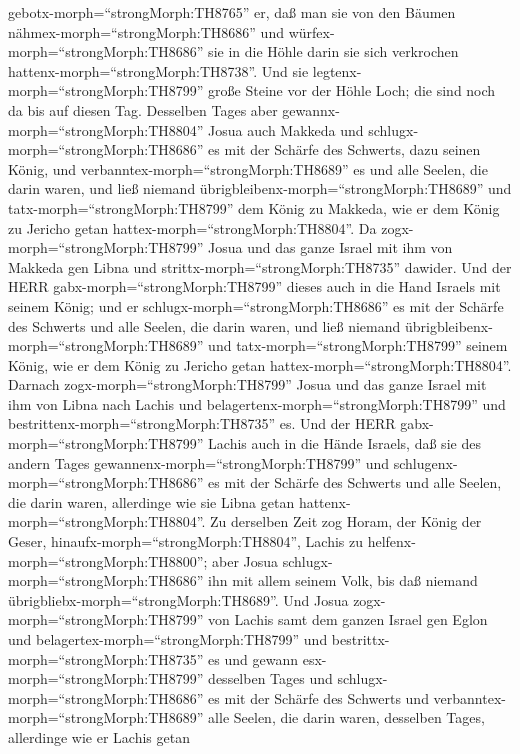 gebotx-morph=``strongMorph:TH8765'' er, daß man sie von den Bäumen
nähmex-morph=``strongMorph:TH8686'' und
würfex-morph=``strongMorph:TH8686'' sie in die Höhle darin sie sich
verkrochen hattenx-morph=``strongMorph:TH8738''. Und sie
legtenx-morph=``strongMorph:TH8799'' große Steine vor der Höhle Loch;
die sind noch da bis auf diesen Tag.  Desselben Tages aber
gewannx-morph=``strongMorph:TH8804'' Josua auch Makkeda und
schlugx-morph=``strongMorph:TH8686'' es mit der Schärfe des Schwerts,
dazu seinen König, und verbanntex-morph=``strongMorph:TH8689'' es und
alle Seelen, die darin waren, und ließ niemand
übrigbleibenx-morph=``strongMorph:TH8689'' und
tatx-morph=``strongMorph:TH8799'' dem König zu Makkeda, wie er dem König
zu Jericho getan hattex-morph=``strongMorph:TH8804''.  Da
zogx-morph=``strongMorph:TH8799'' Josua und das ganze Israel mit ihm von
Makkeda gen Libna und strittx-morph=``strongMorph:TH8735'' dawider.
 Und der HERR gabx-morph=``strongMorph:TH8799'' dieses auch
in die Hand Israels mit seinem König; und er
schlugx-morph=``strongMorph:TH8686'' es mit der Schärfe des Schwerts und
alle Seelen, die darin waren, und ließ niemand
übrigbleibenx-morph=``strongMorph:TH8689'' und
tatx-morph=``strongMorph:TH8799'' seinem König, wie er dem König zu
Jericho getan hattex-morph=``strongMorph:TH8804''.  Darnach
zogx-morph=``strongMorph:TH8799'' Josua und das ganze Israel mit ihm von
Libna nach Lachis und belagertenx-morph=``strongMorph:TH8799'' und
bestrittenx-morph=``strongMorph:TH8735'' es.  Und der HERR
gabx-morph=``strongMorph:TH8799'' Lachis auch in die Hände Israels, daß
sie des andern Tages gewannenx-morph=``strongMorph:TH8799'' und
schlugenx-morph=``strongMorph:TH8686'' es mit der Schärfe des Schwerts
und alle Seelen, die darin waren, allerdinge wie sie Libna getan
hattenx-morph=``strongMorph:TH8804''.  Zu derselben Zeit
zog Horam, der König der Geser, hinaufx-morph=``strongMorph:TH8804'',
Lachis zu helfenx-morph=``strongMorph:TH8800''; aber Josua
schlugx-morph=``strongMorph:TH8686'' ihn mit allem seinem Volk, bis daß
niemand übrigbliebx-morph=``strongMorph:TH8689''.  Und
Josua zogx-morph=``strongMorph:TH8799'' von Lachis samt dem ganzen
Israel gen Eglon und belagertex-morph=``strongMorph:TH8799'' und
bestrittx-morph=``strongMorph:TH8735'' es  und gewann
esx-morph=``strongMorph:TH8799'' desselben Tages und
schlugx-morph=``strongMorph:TH8686'' es mit der Schärfe des Schwerts und
verbanntex-morph=``strongMorph:TH8689'' alle Seelen, die darin waren,
desselben Tages, allerdinge wie er Lachis getan

